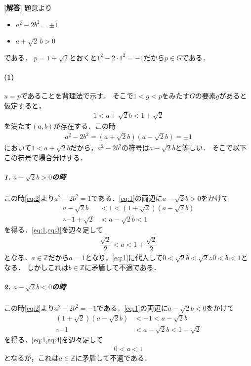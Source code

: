 \documentclass[../../main.tex]{subfiles}
\begin{document}
\begin{oframed}
  
\end{oframed}

{\bf [解答]}
題意より
\begin{itemize}
  \item[(i)] $a^2-2b^2=\pm1$
  \item[(ii)] $a+\sqrt{2}\,b>0$
\end{itemize}
である．
$p=1+\sqrt{2}$とおくと$1^2-2\cdot1^2=-1$だから$p\in G$である．

\paragraph{(1)}
$u=p$であることを背理法で示す．
そこで$1<g<p$をみたす$G$の要素$g$があると仮定すると，
\begin{align}
  1<a+\sqrt{2}b<1+\sqrt{2} \label{eq:1}
\end{align}
を満たす$(a,b)$が存在する．この時
\begin{align}
  a^2-2b^2 = (a+\sqrt{2}b)(a-\sqrt{2}b) = \pm 1 \label{eq:2}
\end{align}
において$1<a+\sqrt{2}b$だから，$a^2-2b^2$の符号は$a-\sqrt{2}b$と等しい．
そこで以下この符号で場合分けする．

\subparagraph{1. $a-\sqrt{2}b>0$の時}

この時\cref{eq:2}より$a^2-2b^2=1$である．\cref{eq:1}の両辺に$a-\sqrt{2}b>0$をかけて
\begin{align}
  a-\sqrt{2}b&<1<(1+\sqrt{2})(a-\sqrt{2}b) \\
  \therefore
  -1+\sqrt{2}&<a-\sqrt{2}b<1 \label{eq:3}
\end{align}
を得る．\cref{eq:1,eq:3}を辺々足して
\begin{align}
  \dfrac{\sqrt{2}}{2}<a<1+\dfrac{\sqrt{2}}{2}
\end{align}
となる．$a\in\mathbb{Z}$だから$a=1$となり，\cref{eq:1}に代入して$0<\sqrt{2}b<\sqrt{2} \therefore 0<b<1$となる．
しかしこれは$b\in\mathbb{Z}$に矛盾して不適である．

\subparagraph{2. $a-\sqrt{2}b<0$の時}

この時\cref{eq:2}より$a^2-2b^2=-1$である．\cref{eq:1}の両辺に$a-\sqrt{2}b<0$をかけて
\begin{align}
  (1+\sqrt{2})(a-\sqrt{2}b)&<-1<a-\sqrt{2}b \\
  \therefore
  -1&<a-\sqrt{2}b<1-\sqrt{2} \label{eq:4}
\end{align}
を得る．\cref{eq:1,eq:4}を辺々足して
\begin{align}
  0<a<1
\end{align}
となるが，これは$a\in\mathbb{Z}$に矛盾して不適である．
\end{document}

